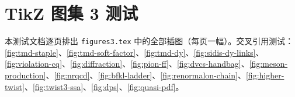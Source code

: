 

\chapter{TikZ 图集 3 测试}
本测试文档逐页排出 \texttt{figures3.tex} 中的全部插图（每页一幅）。交叉引用测试：\cref{fig:tmd-staple}、\cref{fig:tmd-soft-factor}、\cref{fig:tmd-dy}、\cref{fig:sidis-dy-links}、\cref{fig:violation-cq}、\cref{fig:diffraction}、\cref{fig:pion-ff}、\cref{fig:dvcs-handbag}、\cref{fig:meson-production}、\cref{fig:nrqcd}、\cref{fig:bfkl-ladder}、\cref{fig:renormalon-chain}、\cref{fig:higher-twist}、\cref{fig:twist3-ssa}、\cref{fig:dps}、\cref{fig:quasi-pdf}。
\clearpage
\clearpage
\clearpage
\clearpage
\clearpage
\clearpage
\clearpage
\clearpage
\clearpage
\clearpage
\clearpage
\clearpage
\clearpage
\clearpage
\clearpage
\clearpage
\clearpage

